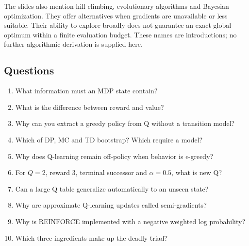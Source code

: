\documentclass[11pt]{article}
\begin{document}
The slides also mention hill climbing, evolutionary algorithms and Bayesian optimization. They offer alternatives when gradients are unavailable or less suitable. Their ability to explore broadly does not guarantee an exact global optimum within a finite evaluation budget. These names are introductions; no further algorithmic derivation is supplied here.
\subsection{Questions}
\begin{enumerate}
\item What information must an MDP state contain?
\item What is the difference between reward and value?
\item Why can you extract a greedy policy from Q without a transition model?
\item Which of DP, MC and TD bootstrap? Which require a model?
\item Why does Q-learning remain off-policy when behavior is $\epsilon$-greedy?
\item For $Q=2$, reward $3$, terminal successor and $\alpha=0.5$, what is new Q?
\item Can a large Q table generalize automatically to an unseen state?
\item Why are approximate Q-learning updates called semi-gradients?
\item Why is REINFORCE implemented with a negative weighted log probability?
\item Which three ingredients make up the deadly triad?
\end{enumerate}
\end{document}
